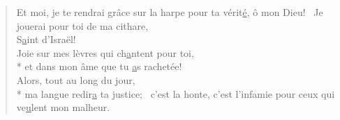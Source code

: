 \begin{verse}
Et moi, je te rendrai grâce sur la harpe
pour ta vérit\underline{é}, ô mon Dieu!~\psalmstar
Je jouerai pour toi de ma cithare, \\
S\underline{a}int d’Israël! \\

Joie sur mes lèvres qui ch\underline{a}ntent pour toi, \\*
et dans mon âme que tu \underline{a}s rachetée! \\
Alors, tout au long du jour, \\*
ma langue redir\underline{a} ta justice;~\psalmstar
c’est la honte, c’est l’infamie
pour ceux qui ve\underline{u}lent mon malheur. \\
\end{verse}

